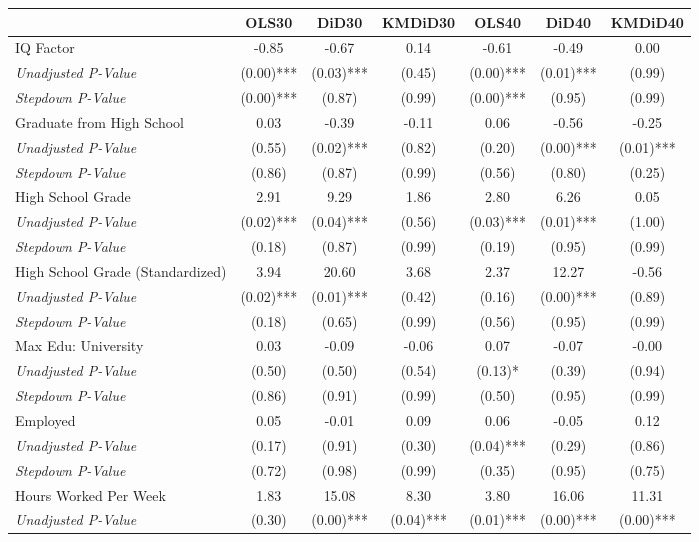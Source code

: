 \begin{tabular}{l c c c c c c}
\toprule
 & OLS30 & DiD30 & KMDiD30 & OLS40 & DiD40 & KMDiD40 \\
\midrule
IQ Factor & -0.85 & -0.67 & 0.14 & -0.61 & -0.49 & 0.00 \\
\quad \textit{Unadjusted P-Value} & (0.00)*** & (0.03)*** & (0.45) & (0.00)*** & (0.01)*** & (0.99) \\
\quad \textit{Stepdown P-Value} & (0.00)*** & (0.87) & (0.99) & (0.00)*** & (0.95) & (0.99) \\
Graduate from High School & 0.03 & -0.39 & -0.11 & 0.06 & -0.56 & -0.25 \\
\quad \textit{Unadjusted P-Value} & (0.55) & (0.02)*** & (0.82) & (0.20) & (0.00)*** & (0.01)*** \\
\quad \textit{Stepdown P-Value} & (0.86) & (0.87) & (0.99) & (0.56) & (0.80) & (0.25) \\
High School Grade & 2.91 & 9.29 & 1.86 & 2.80 & 6.26 & 0.05 \\
\quad \textit{Unadjusted P-Value} & (0.02)*** & (0.04)*** & (0.56) & (0.03)*** & (0.01)*** & (1.00) \\
\quad \textit{Stepdown P-Value} & (0.18) & (0.87) & (0.99) & (0.19) & (0.95) & (0.99) \\
High School Grade (Standardized) & 3.94 & 20.60 & 3.68 & 2.37 & 12.27 & -0.56 \\
\quad \textit{Unadjusted P-Value} & (0.02)*** & (0.01)*** & (0.42) & (0.16) & (0.00)*** & (0.89) \\
\quad \textit{Stepdown P-Value} & (0.18) & (0.65) & (0.99) & (0.56) & (0.95) & (0.99) \\
Max Edu: University & 0.03 & -0.09 & -0.06 & 0.07 & -0.07 & -0.00 \\
\quad \textit{Unadjusted P-Value} & (0.50) & (0.50) & (0.54) & (0.13)* & (0.39) & (0.94) \\
\quad \textit{Stepdown P-Value} & (0.86) & (0.91) & (0.99) & (0.50) & (0.95) & (0.99) \\
Employed & 0.05 & -0.01 & 0.09 & 0.06 & -0.05 & 0.12 \\
\quad \textit{Unadjusted P-Value} & (0.17) & (0.91) & (0.30) & (0.04)*** & (0.29) & (0.86) \\
\quad \textit{Stepdown P-Value} & (0.72) & (0.98) & (0.99) & (0.35) & (0.95) & (0.75) \\
Hours Worked Per Week & 1.83 & 15.08 & 8.30 & 3.80 & 16.06 & 11.31 \\
\quad \textit{Unadjusted P-Value} & (0.30) & (0.00)*** & (0.04)*** & (0.01)*** & (0.00)*** & (0.00)*** \\

\end{tabular}
